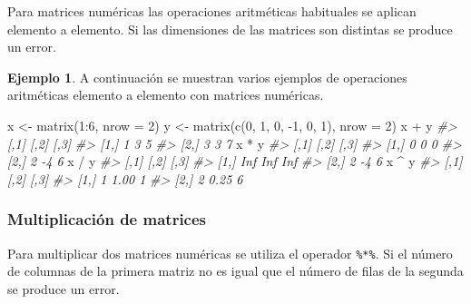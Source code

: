 \documentclass[
]{book}
\newenvironment{Shaded}{\begin{snugshade}}{\end{snugshade}}
\newcommand{\AttributeTok}[1]{\textcolor[rgb]{0.77,0.63,0.00}{#1}}
\newcommand{\CommentTok}[1]{\textcolor[rgb]{0.56,0.35,0.01}{\textit{#1}}}
\newcommand{\DecValTok}[1]{\textcolor[rgb]{0.00,0.00,0.81}{#1}}
\newcommand{\FunctionTok}[1]{\textcolor[rgb]{0.00,0.00,0.00}{#1}}
\newcommand{\NormalTok}[1]{#1}
\newcommand{\OtherTok}[1]{\textcolor[rgb]{0.56,0.35,0.01}{#1}}
\newcommand{\SpecialCharTok}[1]{\textcolor[rgb]{0.00,0.00,0.00}{#1}}
\theoremstyle{definition}
\theoremstyle{definition}
\newtheorem{example}{Ejemplo}[chapter]
\theoremstyle{definition}
\theoremstyle{definition}
\theoremstyle{remark}
\begin{document}
Para matrices numéricas las operaciones aritméticas habituales se aplican elemento a elemento. Si las dimensiones de las matrices son distintas se produce un error.

\begin{example}

A continuación se muestran varios ejemplos de operaciones aritméticas elemento a elemento con matrices numéricas.

\begin{Shaded}
\begin{Highlighting}[]
\NormalTok{x }\OtherTok{\textless{}{-}} \FunctionTok{matrix}\NormalTok{(}\DecValTok{1}\SpecialCharTok{:}\DecValTok{6}\NormalTok{, }\AttributeTok{nrow =} \DecValTok{2}\NormalTok{)}
\NormalTok{y }\OtherTok{\textless{}{-}} \FunctionTok{matrix}\NormalTok{(}\FunctionTok{c}\NormalTok{(}\DecValTok{0}\NormalTok{, }\DecValTok{1}\NormalTok{, }\DecValTok{0}\NormalTok{, }\SpecialCharTok{{-}}\DecValTok{1}\NormalTok{, }\DecValTok{0}\NormalTok{, }\DecValTok{1}\NormalTok{), }\AttributeTok{nrow =} \DecValTok{2}\NormalTok{)}
\NormalTok{x }\SpecialCharTok{+}\NormalTok{ y}
\CommentTok{\#\textgreater{}      [,1] [,2] [,3]}
\CommentTok{\#\textgreater{} [1,]    1    3    5}
\CommentTok{\#\textgreater{} [2,]    3    3    7}
\NormalTok{x }\SpecialCharTok{*}\NormalTok{ y}
\CommentTok{\#\textgreater{}      [,1] [,2] [,3]}
\CommentTok{\#\textgreater{} [1,]    0    0    0}
\CommentTok{\#\textgreater{} [2,]    2   {-}4    6}
\NormalTok{x }\SpecialCharTok{/}\NormalTok{ y}
\CommentTok{\#\textgreater{}      [,1] [,2] [,3]}
\CommentTok{\#\textgreater{} [1,]  Inf  Inf  Inf}
\CommentTok{\#\textgreater{} [2,]    2   {-}4    6}
\NormalTok{x }\SpecialCharTok{\^{}}\NormalTok{ y}
\CommentTok{\#\textgreater{}      [,1] [,2] [,3]}
\CommentTok{\#\textgreater{} [1,]    1 1.00    1}
\CommentTok{\#\textgreater{} [2,]    2 0.25    6}
\end{Highlighting}
\end{Shaded}

\end{example}

\hypertarget{multiplicaciuxf3n-de-matrices}{%
\subsubsection{Multiplicación de matrices}\label{multiplicaciuxf3n-de-matrices}}

Para multiplicar dos matrices numéricas se utiliza el operador \texttt{\%*\%}. Si el número de columnas de la primera matriz no es igual que el número de filas de la segunda se produce un error.
\end{document}
